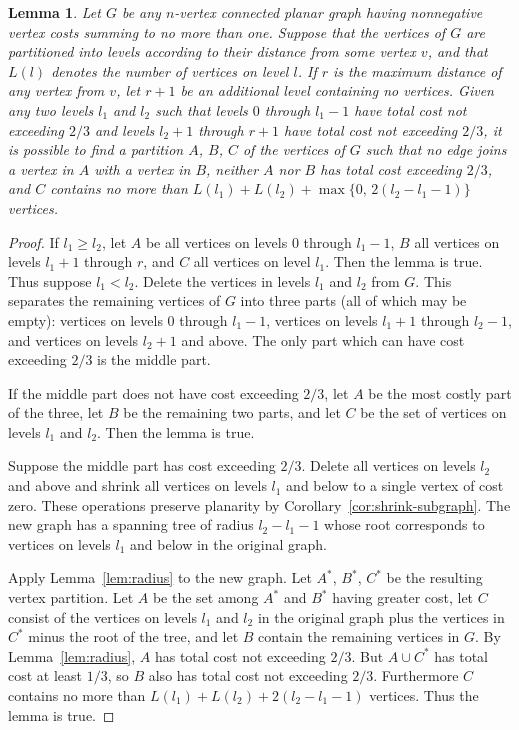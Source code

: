 \documentclass[12pt]{article}
\newtheorem{lemma}{Lemma}
\theoremstyle{remark}
\begin{document}
\begin{lemma}
\label{lem:levels}
Let $G$ be any $n$-vertex connected planar graph having nonnegative vertex costs
summing to no more than one. Suppose that the vertices of $G$ are partitioned into
levels according to their distance from some vertex $v$, and that $L(l)$ denotes the
number of vertices on level $l$. If $r$ is the maximum distance of any vertex from
$v$, let $r+1$ be an additional level containing no vertices. Given any two levels
$l_1$ and $l_2$ such that levels $0$ through $l_1 - 1$ have total cost not exceeding
$2/3$ and levels $l_2 + 1$ through $r+1$ have total cost not exceeding $2/3$, it is
possible to find a partition $A$, $B$, $C$ of the vertices of $G$ such that no edge
joins a vertex in $A$ with a vertex in $B$, neither $A$ nor $B$ has total cost
exceeding $2/3$, and $C$ contains no more than
$L(l_1) + L(l_2) + \max\{0, \, 2(l_2 - l_1 - 1)\}$ vertices.
\end{lemma}

\begin{proof}
If $l_1 \geq l_2$, let $A$ be all vertices on levels $0$ through $l_1 - 1$, $B$ all
vertices on levels $l_1 + 1$ through $r$, and $C$ all vertices on level $l_1$. Then
the lemma is true. Thus suppose $l_1 < l_2$. Delete the vertices in levels $l_1$ and
$l_2$ from $G$. This separates the remaining vertices of $G$ into three parts (all of
which may be empty): vertices on levels $0$ through $l_1 - 1$, vertices on levels
$l_1 + 1$ through $l_2 - 1$, and vertices on levels $l_2 + 1$ and above. The only
part which can have cost exceeding $2/3$ is the middle part.

If the middle part does not have cost exceeding $2/3$, let $A$ be the most costly
part of the three, let $B$ be the remaining two parts, and let $C$ be the set of
vertices on levels $l_1$ and $l_2$. Then the lemma is true.

Suppose the middle part has cost exceeding $2/3$. Delete all vertices on levels
$l_2$ and above and shrink all vertices on levels $l_1$ and below to a single vertex
of cost zero. These operations preserve planarity by Corollary~\ref{cor:shrink-subgraph}.
The new graph has a spanning tree of radius $l_2 - l_1 - 1$ whose root corresponds
to vertices on levels $l_1$ and below in the original graph.

Apply Lemma~\ref{lem:radius} to the new graph. Let $A^*$, $B^*$, $C^*$ be the
resulting vertex partition. Let $A$ be the set among $A^*$ and $B^*$ having greater
cost, let $C$ consist of the vertices on levels $l_1$ and $l_2$ in the original graph
plus the vertices in $C^*$ minus the root of the tree, and let $B$ contain the
remaining vertices in $G$. By Lemma~\ref{lem:radius}, $A$ has total cost not
exceeding $2/3$. But $A \cup C^*$ has total cost at least $1/3$, so $B$ also has
total cost not exceeding $2/3$. Furthermore $C$ contains no more than
$L(l_1) + L(l_2) + 2(l_2 - l_1 - 1)$ vertices. Thus the lemma is true.
\end{proof}
\end{document}
